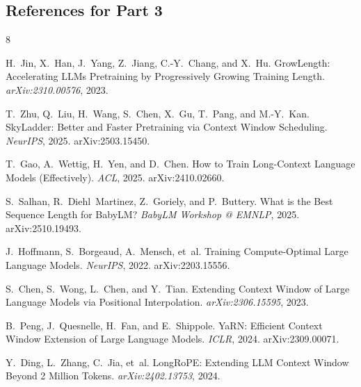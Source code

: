 \subsection*{References for Part 3}
\begin{thebibliography}{8}

H.~Jin, X.~Han, J.~Yang, Z.~Jiang, C.-Y.~Chang, and X.~Hu.
\newblock GrowLength: Accelerating LLMs Pretraining by Progressively Growing Training Length.
\newblock \textit{arXiv:2310.00576}, 2023.

T.~Zhu, Q.~Liu, H.~Wang, S.~Chen, X.~Gu, T.~Pang, and M.-Y.~Kan.
\newblock SkyLadder: Better and Faster Pretraining via Context Window Scheduling.
\newblock \textit{NeurIPS}, 2025. arXiv:2503.15450.

T.~Gao, A.~Wettig, H.~Yen, and D.~Chen.
\newblock How to Train Long-Context Language Models (Effectively).
\newblock \textit{ACL}, 2025. arXiv:2410.02660.

S.~Salhan, R.~Diehl~Martinez, Z.~Goriely, and P.~Buttery.
\newblock What is the Best Sequence Length for BabyLM?
\newblock \textit{BabyLM Workshop @ EMNLP}, 2025. arXiv:2510.19493.

J.~Hoffmann, S.~Borgeaud, A.~Mensch, et~al.
\newblock Training Compute-Optimal Large Language Models.
\newblock \textit{NeurIPS}, 2022. arXiv:2203.15556.

S.~Chen, S.~Wong, L.~Chen, and Y.~Tian.
\newblock Extending Context Window of Large Language Models via Positional Interpolation.
\newblock \textit{arXiv:2306.15595}, 2023.

B.~Peng, J.~Quesnelle, H.~Fan, and E.~Shippole.
\newblock YaRN: Efficient Context Window Extension of Large Language Models.
\newblock \textit{ICLR}, 2024. arXiv:2309.00071.

Y.~Ding, L.~Zhang, C.~Jia, et~al.
\newblock LongRoPE: Extending LLM Context Window Beyond 2 Million Tokens.
\newblock \textit{arXiv:2402.13753}, 2024.

\end{thebibliography}


